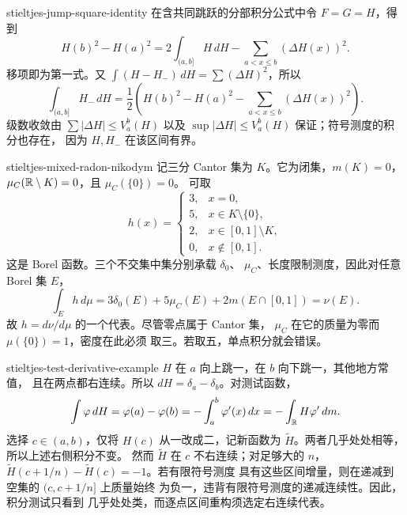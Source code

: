\begin{solution}{stieltjes-jump-square-identity}
在含共同跳跃的分部积分公式中令 \(F=G=H\)，得到
\[
 H(b)^2-H(a)^2
 =2\int_{(a,b]}H\,dH-\sum_{a<x\le b}(\Delta H(x))^2.
\]
移项即为第一式。又
\(\int(H-H_-)\,dH=\sum(\Delta H)^2\)，所以
\[
 \int_{(a,b]}H_-\,dH
 =\frac12\left(H(b)^2-H(a)^2-
      \sum_{a<x\le b}(\Delta H(x))^2\right).
\]
级数收敛由 \(\sum|\Delta H|\le V_a^b(H)\) 以及
\(\sup|\Delta H|\le V_a^b(H)\) 保证；符号测度的积分也存在，
因为 \(H,H_-\) 在该区间有界。
\end{solution}

\begin{solution}{stieltjes-mixed-radon-nikodym}
记三分 Cantor 集为 \(K\)。它为闭集，\(m(K)=0\)，
\(\mu_C(\mathbb{R}\setminus K)=0\)，且 \(\mu_C(\{0\})=0\)。
可取
\[
 h(x)=\begin{cases}
 3,&x=0,\\
 5,&x\in K\setminus\{0\},\\
 2,&x\in[0,1]\setminus K,\\
 0,&x\notin[0,1].
 \end{cases}
\]
这是 Borel 函数。三个不交集中集分别承载 \(\delta_0\)、
\(\mu_C\)、长度限制测度，因此对任意 Borel 集 \(E\)，
\[
 \int_Eh\,d\mu
 =3\delta_0(E)+5\mu_C(E)+2m(E\cap[0,1])=\nu(E).
\]
故 \(h=d\nu/d\mu\) 的一个代表。尽管零点属于 Cantor 集，
\(\mu_C\) 在它的质量为零而 \(\mu(\{0\})=1\)，密度在此必须
取三。若取五，单点积分就会错误。
\end{solution}

\begin{solution}{stieltjes-test-derivative-example}
\(H\) 在 \(a\) 向上跳一，在 \(b\) 向下跳一，其他地方常值，
且在两点都右连续。所以 \(dH=\delta_a-\delta_b\)。对测试函数，
\[
 \int\varphi\,dH=\varphi(a)-\varphi(b)
 =-\int_a^b\varphi'(x)\,dx=-\int_{\mathbb{R}} H\varphi'\,dm.
\]
选择 \(c\in(a,b)\)，仅将 \(H(c)\) 从一改成二，记新函数为
\(\widetilde H\)。两者几乎处处相等，所以上述右侧积分不变。
然而 \(\widetilde H\) 在 \(c\) 不右连续；对足够大的 \(n\)，
\(\widetilde H(c+1/n)-\widetilde H(c)=-1\)。若有限符号测度
具有这些区间增量，则在递减到空集的 \((c,c+1/n]\) 上质量始终
为负一，违背有限符号测度的递减连续性。因此，积分测试只看到
几乎处处类，而逐点区间重构须选定右连续代表。
\end{solution}

